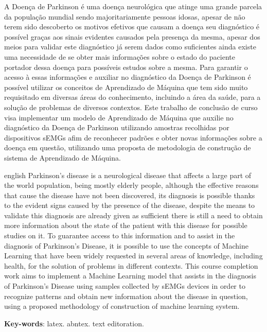 \begin{resumo}[Abstract]

  A Doença de Parkinson é uma doença neurológica que atinge uma grande parcela da população mundial sendo majoritariamente pessoas idosas, apesar de não terem sido descoberto os motivos efetivos que causam a doença seu diagnóstico é possível graças aos sinais evidentes causados pela presença da mesma, apesar dos meios para validar este diagnóstico já serem dados como suficientes ainda existe uma necessidade de se obter mais informações sobre o estado do paciente portador dessa doença para possíveis estudos sobre a mesma. Para garantir o acesso à essas informações e auxiliar no diagnóstico da Doença de Parkinson é possível utilizar os conceitos de Aprendizado de Máquina que tem sido muito requisitado em diversas áreas do conhecimento, incluindo a área da saúde, para a solução de problemas de diversos contextos. Este trabalho de conclusão de curso visa implementar um modelo de Aprendizado de Máquina que auxilie no diagnóstico da Doença de Parkinson utilizando amostras recolhidas por dispositivos sEMGs afim de reconhecer padrões e obter novas informações sobre a doença em questão, utilizando uma proposta de metodologia de construção de sistema de Aprendizado de Máquina.

 \begin{otherlanguage*}{english}
  Parkinson's disease is a neurological disease that affects a large part of the world population, being mostly elderly people, although the effective reasons that cause the disease have not been discovered, its diagnosis is possible thanks to the evident signs caused by the presence of the disease, despite the means to validate this diagnosis are already given as sufficient there is still a need to obtain more information about the state of the patient with this disease for possible studies on it. To guarantee access to this information and to assist in the diagnosis of Parkinson's Disease, it is possible to use the concepts of Machine Learning that have been widely requested in several areas of knowledge, including health, for the solution of problems in different contexts. This course completion work aims to implement a Machine Learning model that assists in the diagnosis of Parkinson's Disease using samples collected by sEMGs devices in order to recognize patterns and obtain new information about the disease in question, using a proposed methodology of construction of machine learning system.

   \vspace{\onelineskip}
 
   \noindent 
   \textbf{Key-words}: latex. abntex. text editoration.
 \end{otherlanguage*}
\end{resumo}
